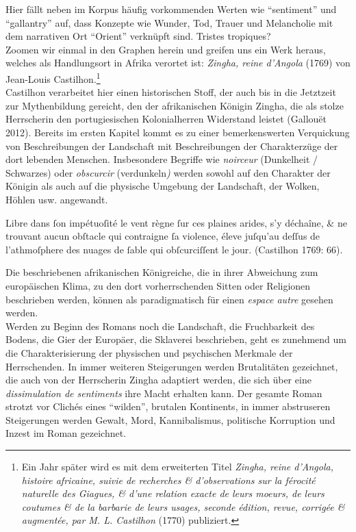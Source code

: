\documentclass[
  12pt,
  letterpaper,
  DIV=11,
  numbers=noendperiod]{scrreprt}
\begin{document}
Hier fällt neben im Korpus häufig vorkommenden Werten wie ``sentiment''
und ``gallantry'' auf, dass Konzepte wie Wunder, Tod, Trauer und
Melancholie mit dem narrativen Ort ``Orient'' verknüpft sind. Tristes
tropiques?\\
Zoomen wir einmal in den Graphen herein und greifen uns ein Werk heraus,
welches als Handlungsort in Afrika verortet ist: \emph{Zingha, reine
d'Angola} (1769) von Jean-Louis Castilhon.\footnote{Ein Jahr später wird
  es mit dem erweiterten Titel \emph{Zingha, reine d'Angola, histoire
  africaine, suivie de recherches \& d'observations sur la férocité
  naturelle des Giagues, \& d'une relation exacte de leurs moeurs, de
  leurs coutumes \& de la barbarie de leurs usages, seconde édition,
  revue, corrigée \& augmentée, par M. L. Castilhon} (1770) publiziert.}\\
Castilhon verarbeitet hier einen historischen Stoff, der auch bis in die
Jetztzeit zur Mythenbildung gereicht, den der afrikanischen Königin
Zingha, die als stolze Herrscherin den portugiesischen Kolonialherren
Widerstand leistet (Gallouët 2012). Bereits im ersten Kapitel kommt es
zu einer bemerkenswerten Verquickung von Beschreibungen der Landschaft
mit Beschreibungen der Charakterzüge der dort lebenden Menschen.
Insbesondere Begriffe wie \emph{noirceur} (Dunkelheit / Schwarzes) oder
\emph{obscurcir} (verdunkeln\emph{)} werden sowohl auf den Charakter der
Königin als auch auf die physische Umgebung der Landschaft, der Wolken,
Höhlen usw. angewandt.

Libre dans ſon impétuoſité le vent règne ſur ces plaines arides, s'y
déchaîne, \& ne\\
trouvant aucun obſtacle qui contraigne ſa violence, éleve juſqu'au
deſſus de\\
l'athmoſphere des nuages de ſable qui obſcurciſſent le jour. (Castilhon
1769: 66).

Die beschriebenen afrikanischen Königreiche, die in ihrer Abweichung zum
europäischen Klima, zu den dort vorherrschenden Sitten oder Religionen
beschrieben werden, können als paradigmatisch für einen \emph{espace
autre} gesehen werden.\\
Werden zu Beginn des Romans noch die Landschaft, die Fruchbarkeit des
Bodens, die Gier der Europäer, die Sklaverei beschrieben, geht es
zunehmend um die Charakterisierung der physischen und psychischen
Merkmale der Herrschenden. In immer weiteren Steigerungen werden
Brutalitäten gezeichnet, die auch von der Herrscherin Zingha adaptiert
werden, die sich über eine \emph{dissimulation de sentiments} ihre Macht
erhalten kann. Der gesamte Roman strotzt vor Clichés eines ``wilden'',
brutalen Kontinents, in immer abstruseren Steigerungen werden Gewalt,
Mord, Kannibalismus, politische Korruption und Inzest im Roman
gezeichnet.
\end{document}
